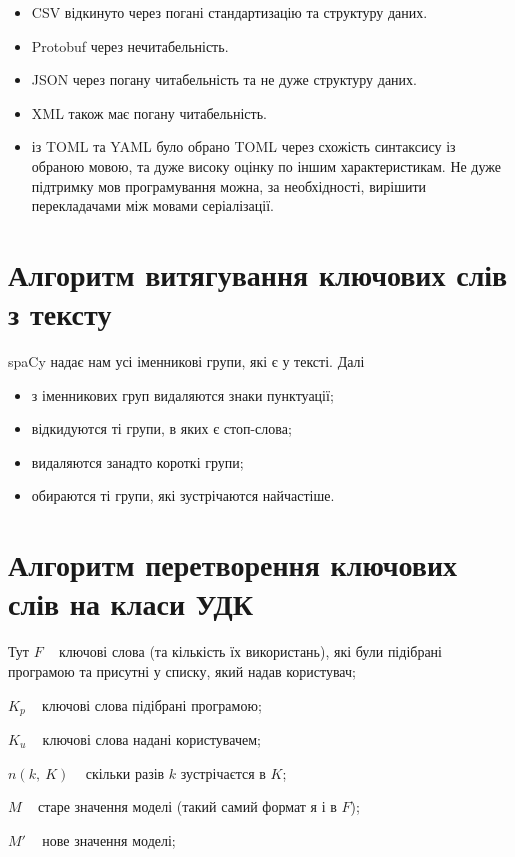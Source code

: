 \documentclass{article}
\let\oldsection\section
\renewcommand{\section}{\clearpage\oldsection}
\begin{document}
\hrulefill

\begin{itemize}
	\item CSV відкинуто через погані стандартизацію та структуру даних.
	\item Protobuf через нечитабельність.
	\item JSON через погану читабельність та не дуже структуру даних.
	\item XML також має погану читабельність.
	\item із TOML та YAML було обрано TOML через схожість синтаксису із обраною мовою,
	та дуже високу оцінку по іншим характеристикам.
	Не дуже підтримку мов програмування можна, за необхідності,
	вирішити перекладачами між мовами серіалізації.
\end{itemize}

\section{Алгоритм витягування ключових слів з тексту}
	spaCy надає нам усі іменникові групи, які є у тексті. Далі
\begin{itemize}
  \item з іменникових груп видаляются знаки пунктуації;
  \item відкидуются ті групи, в яких є стоп-слова;
  \item видаляются занадто короткі групи;
  \item обираются ті групи, які зустрічаются найчастіше.
\end{itemize}


\section{Алгоритм перетворення ключових слів на класи УДК}

Тут $F$ \textemdash~ ключові слова (та кількість їх використань),
      які були підібрані програмою та присутні у списку, який надав користувач;

  $K_p$ \textemdash~ ключові слова підібрані програмою;

  $K_u$ \textemdash~ ключові слова надані користувачем;

  $n(k,~ K)$ \textemdash~ скільки разів $k$ зустрічаєтся в $K$;

  $M$ \textemdash~ старе значення моделі (такий самий формат я і в $F$);

  $M'$ \textemdash~ нове значення моделі;
\end{document}
